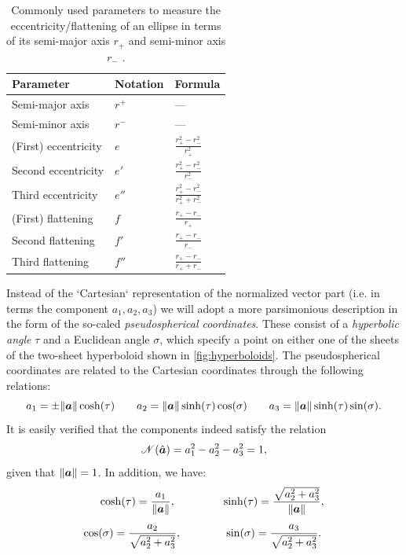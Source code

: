 \renewcommand{\arraystretch}{1.4}
\begin{table}[ht]
    \centering
    \caption{Commonly used parameters to measure the eccentricity/flattening of an ellipse in terms of its semi-major axis \(r_+\) and semi-minor axis \(r_-\) \cite{Rapp1991}.}
    \label{tab:ellipse}
    \begin{tabular}{lll}
    \toprule
        \textbf{Parameter} & \textbf{Notation} & \textbf{Formula} \\
    \midrule
        Semi-major axis & \(r^+\) & --- \\ 
        Semi-minor axis & \(r^-\) & --- \\
    \midrule
        (First) eccentricity & \(e\) & \(\frac{r_+^2 - r_-^2}{r_+^2}\) \\
        Second eccentricity & \(e'\) & \(\frac{r_+^2 - r_-^2}{r_-^2}\) \\
        Third eccentricity & \(e''\) & \(\frac{r_+^2 - r_-^2}{r_+^2 + r_-^2}\) \\
    \midrule
        (First) flattening & \(f\) & \(\frac{r_+ - r_-}{r_+}\) \\
        Second flattening & \(f'\) & \(\frac{r_+ - r_-}{r_-}\) \\
        Third flattening & \(f''\) & \(\frac{r_+ - r_-}{r_+ + r_-}\) \\
    \bottomrule
    \end{tabular}
\end{table}
\renewcommand{\arraystretch}{1}

Instead of the `Cartesian` representation of the normalized vector part (i.e. in terms the component \(a_1, a_2, a_3\)) we will adopt a more parsimonious description in the form of the so-caled \emph{pseudospherical coordinates}. These consist of a \emph{hyperbolic angle} \(\tau\)  and a Euclidean angle \(\sigma\), which specify a point on either one of the sheets of the two-sheet hyperboloid shown in \cref{fig:hyperboloids}. The pseudospherical coordinates are related to the Cartesian coordinates through the following relations:
\begin{equation}
    a_1 = \pm\norm{\vec{a}}\cosh(\tau) \qquad a_2 = \norm{\vec{a}}\sinh(\tau) \cos(\sigma) \qquad a_3 = \norm{\vec{a}}\sinh(\tau) \sin(\sigma).
\end{equation}
It is easily verified that the components indeed satisfy the relation
\begin{equation} 
    \mathscr{N}(\uvec{a}) = a_1^2 - a_2^2 - a_3^2 = 1, 
\end{equation}
given that \(\norm{\vec{a}} = 1\). In addition, we have:
\begin{equation} 
    \begin{array}{cc}
        \displaystyle \cosh(\tau) = \frac{a_1}{\norm{\vec{a}}}, \quad & \quad 
        \displaystyle \sinh(\tau) = \frac{\sqrt{a_2^2 + a_3^2}}{\norm{\vec{a}}}, \\[0.5cm]
        \displaystyle \cos(\sigma) = \frac{a_2}{\sqrt{a_2^2 + a_3^2}}, \qquad & \quad
        \displaystyle \sin(\sigma) = \frac{a_3}{\sqrt{a_2^2 + a_3^2}}. 
    \end{array}
    \label{eq:hyperb_coordinate_relations}
\end{equation}

